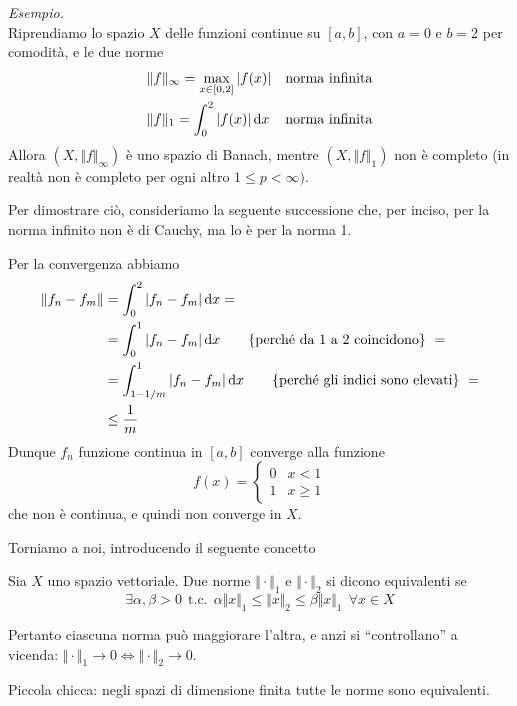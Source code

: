 \textit{Esempio.}\\
Riprendiamo lo spazio $X$ delle funzioni continue su $[a,b]$, con $a=0$ e $b=2$ per comodità, e le due norme 
\begin{align*}
&\Vert f \Vert_\infty =\max_{x\in[0,2]} |f(x)| &\text{norma infinita} \\
&\Vert f \Vert_1 =\int_0^2 |f(x)| \, \mathrm{d} x &\text{norma infinita}
\end{align*}
Allora $\left(X,\Vert f \Vert_\infty\right)$ è uno spazio di Banach, mentre $\left(X,\Vert f \Vert_1\right)$ non è completo (in realtà non è completo per ogni altro $1\leq p<\infty)$.

Per dimostrare ciò, consideriamo la seguente successione
che, per inciso, per la norma infinito non è di Cauchy, ma lo è per la norma 1. 

\newpage

Per la convergenza abbiamo
\begin{align*}
\Vert f_n-f_m \Vert&=\int_0^2|f_n-f_m|\, \mathrm{d} x = \\
&=\int_0^1 |f_n-f_m|\, \mathrm{d} x \qquad \{\text{perché da 1 a 2 coincidono} \}\ = \\
&=\int_{1-1/m}^1|f_n-f_m|\, \mathrm{d} x \qquad \{\text{perché gli indici sono elevati} \}\ = \\
&\leq \frac{1}{m}
\end{align*}
Dunque $f_n$ funzione continua in $[a,b]$ converge alla funzione
\begin{equation*}
f(x)=\begin{cases}
0 & x<1 \\
1 & x\geq 1
\end{cases}
\end{equation*}
che non è continua, e quindi non converge in $X$.

Torniamo a noi, introducendo il seguente concetto
\begin{defn}
Sia $X$ uno spazio vettoriale. Due norme $\Vert\cdot\Vert_1$ e $\Vert\cdot\Vert_2$ si dicono equivalenti se
\begin{equation*}
\exists \alpha,\beta>0\ \ \text{t.c.}\ \ \alpha\Vert x\Vert_1\leq \Vert x\Vert_2 \leq \beta\Vert x\Vert_1\ \ \forall x\in X
\end{equation*}
\end{defn}

Pertanto ciascuna norma può maggiorare l'altra, e anzi si ``controllano'' a vicenda: $\Vert\cdot\Vert_1\to 0\Leftrightarrow\Vert\cdot\Vert_2\to 0$.

Piccola chicca: negli spazi di dimensione finita tutte le norme sono equivalenti.


